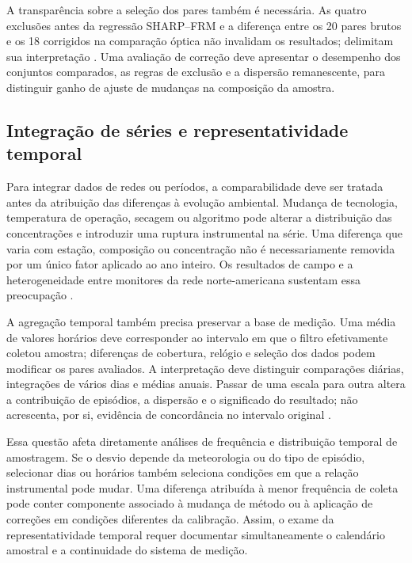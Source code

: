 A transparência sobre a seleção dos pares também é necessária. As quatro exclusões antes da regressão SHARP--FRM e a diferença entre os 20 pares brutos e os 18 corrigidos na comparação óptica não invalidam os resultados; delimitam sua interpretação \parencite{rsl059,rsl089}. Uma avaliação de correção deve apresentar o desempenho dos conjuntos comparados, as regras de exclusão e a dispersão remanescente, para distinguir ganho de ajuste de mudanças na composição da amostra.

\subsection{Integração de séries e representatividade temporal}

Para integrar dados de redes ou períodos, a comparabilidade deve ser tratada antes da atribuição das diferenças à evolução ambiental. Mudança de tecnologia, temperatura de operação, secagem ou algoritmo pode alterar a distribuição das concentrações e introduzir uma ruptura instrumental na série. Uma diferença que varia com estação, composição ou concentração não é necessariamente removida por um único fator aplicado ao ano inteiro. Os resultados de campo e a heterogeneidade entre monitores da rede norte-americana sustentam essa preocupação \parencite{rsl049,rsl144,rsl026}.

A agregação temporal também precisa preservar a base de medição. Uma média de valores horários deve corresponder ao intervalo em que o filtro efetivamente coletou amostra; diferenças de cobertura, relógio e seleção dos dados podem modificar os pares avaliados. A interpretação deve distinguir comparações diárias, integrações de vários dias e médias anuais. Passar de uma escala para outra altera a contribuição de episódios, a dispersão e o significado do resultado; não acrescenta, por si, evidência de concordância no intervalo original \parencite{rsl129,rsl188,rsl026}.

Essa questão afeta diretamente análises de frequência e distribuição temporal de amostragem. Se o desvio depende da meteorologia ou do tipo de episódio, selecionar dias ou horários também seleciona condições em que a relação instrumental pode mudar. Uma diferença atribuída à menor frequência de coleta pode conter componente associado à mudança de método ou à aplicação de correções em condições diferentes da calibração. Assim, o exame da representatividade temporal requer documentar simultaneamente o calendário amostral e a continuidade do sistema de medição.

